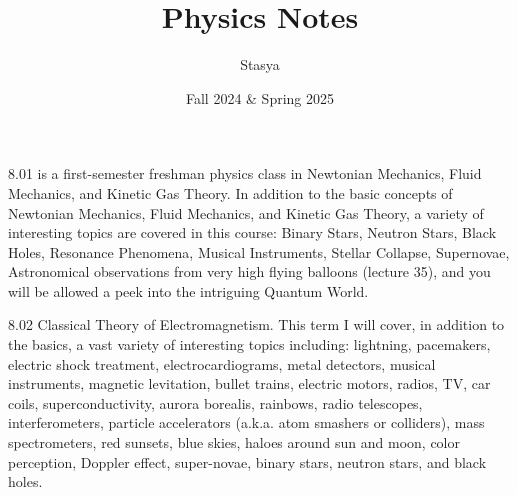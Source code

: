\documentclass[10pt,a4paper,oneside]{book}
\title{Physics Notes}
\author{Stasya}
\date{Fall 2024 \& Spring 2025}
\begin{document}
\maketitle
\bigbreak
\begin{center}
    8.01 is a first-semester freshman physics class in Newtonian Mechanics, Fluid Mechanics, and Kinetic Gas Theory. In addition 
    to the basic concepts of Newtonian Mechanics, Fluid Mechanics, and Kinetic Gas Theory, a variety of interesting topics are 
    covered in this course: Binary Stars, Neutron Stars, Black Holes, Resonance Phenomena, Musical Instruments, Stellar Collapse, 
    Supernovae, Astronomical observations from very high flying balloons (lecture 35), and you will be allowed a peek into the 
    intriguing Quantum World.

    8.02 Classical Theory of Electromagnetism. This term I will cover, in addition to the basics, a vast variety of interesting 
    topics including: lightning, pacemakers, electric shock treatment, electrocardiograms, metal detectors, musical instruments, 
    magnetic levitation, bullet trains, electric motors, radios, TV, car coils, superconductivity, aurora borealis, rainbows, 
    radio telescopes, interferometers, particle accelerators (a.k.a. atom smashers or colliders), mass spectrometers, red sunsets, 
    blue skies, haloes around sun and moon, color perception, Doppler effect, super-novae, binary stars, neutron stars, and 
    black holes.
\end{center}
\bigbreak
\tableofcontents








\end{document}
